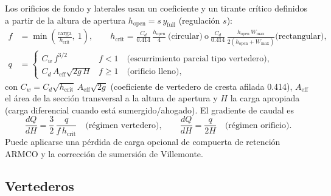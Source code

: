 \documentclass[11pt,a4paper]{article}
\begin{document}
Los orificios de fondo y laterales usan un coeficiente y un tirante crítico
definidos a partir de la altura de apertura $h_{\mathrm{open}} =
s\,y_{\mathrm{full}}$ (regulación $s$):
\begin{align}
  f &= \min\!\left(\frac{\text{carga}}{h_{\mathrm{crit}}},\ 1\right),
  \qquad h_{\mathrm{crit}} = \frac{C_d}{0.414}\,\frac{h_{\mathrm{open}}}
    {4}\ \text{(circular)}\ \text{o}\ \frac{C_d}{0.414}\,
    \frac{h_{\mathrm{open}}\,W_{\max}}{2(h_{\mathrm{open}} + W_{\max})}
    \text{(rectangular)},\\
  q &= \begin{cases}
    C_w\,f^{3/2} & f < 1 \quad\text{(escurrimiento parcial tipo vertedero)},\\
    C_d\,A_{\mathrm{eff}}\sqrt{2g\,H} & f \ge 1 \quad\text{(orificio lleno)},
  \end{cases}
\end{align}
con $C_w = C_d\sqrt{h_{\mathrm{crit}}}\,A_{\mathrm{eff}}\sqrt{2g}$
(coeficiente de vertedero de cresta afilada 0.414), $A_{\mathrm{eff}}$ el área
de la sección transversal a la altura de apertura y $H$ la carga apropiada
(carga diferencial cuando está sumergido/ahogado). El gradiente de caudal es
\begin{equation}
  \frac{dQ}{dH} = \frac{3}{2}\,\frac{q}{f\,h_{\mathrm{crit}}}
  \quad\text{(régimen vertedero)}, \qquad
  \frac{dQ}{dH} = \frac{q}{2H}
  \quad\text{(régimen orificio)}.
\end{equation}
Puede aplicarse una pérdida de carga opcional de compuerta de retención ARMCO y
la corrección de sumersión de Villemonte.

\subsection{Vertederos}
\end{document}
